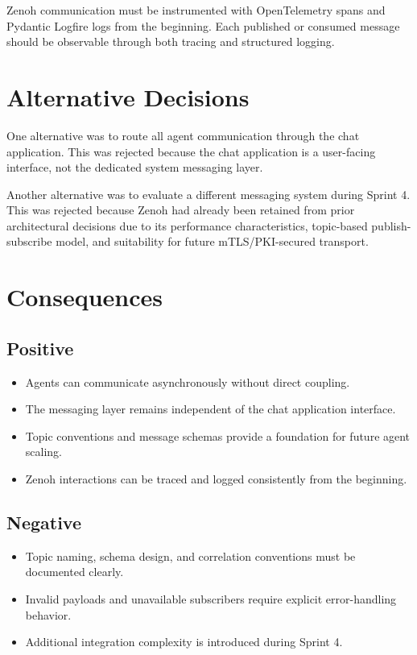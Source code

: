 \documentclass[11pt]{article}
\begin{document}
Zenoh communication must be instrumented with OpenTelemetry spans and Pydantic Logfire logs from the beginning. Each published or consumed message should be observable through both tracing and structured logging.

\section{Alternative Decisions}

One alternative was to route all agent communication through the chat application. This was rejected because the chat application is a user-facing interface, not the dedicated system messaging layer.

Another alternative was to evaluate a different messaging system during Sprint 4. This was rejected because Zenoh had already been retained from prior architectural decisions due to its performance characteristics, topic-based publish-subscribe model, and suitability for future mTLS/PKI-secured transport.

\section{Consequences}

\subsection{Positive}

\begin{itemize}
    \item Agents can communicate asynchronously without direct coupling.
    \item The messaging layer remains independent of the chat application interface.
    \item Topic conventions and message schemas provide a foundation for future agent scaling.
    \item Zenoh interactions can be traced and logged consistently from the beginning.
\end{itemize}

\subsection{Negative}

\begin{itemize}
    \item Topic naming, schema design, and correlation conventions must be documented clearly.
    \item Invalid payloads and unavailable subscribers require explicit error-handling behavior.
    \item Additional integration complexity is introduced during Sprint 4.
\end{itemize}
\end{document}
